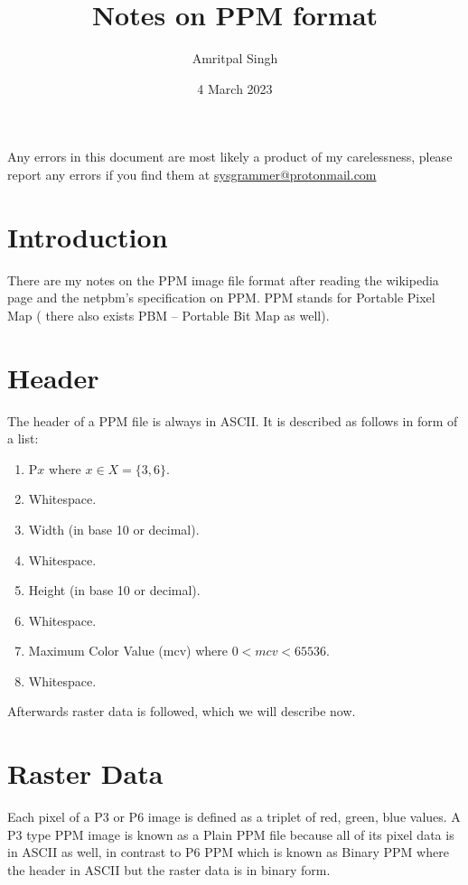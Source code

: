 \documentclass{article}
\title{Notes on PPM format}
\author{Amritpal Singh}
\date{4 March 2023}
\begin{document}
\maketitle

\newpage
\tableofcontents
\vspace{400px}
Any errors in this document are most likely a product of my carelessness, 
please report any errors if you find them at
\href{mailto:sysgrammer@protonmail.com}{sysgrammer@protonmail.com}

\newpage
\section{Introduction}
There are my notes on the PPM image file format after reading the wikipedia page
and the netpbm's specification on PPM. PPM stands for Portable Pixel Map (
there also exists PBM -- Portable Bit Map as well).

\section{Header}
The header of a PPM file is always in ASCII. It is described as follows in form
of a list:
\begin{enumerate}
    \item P$x$ where $x \in X = \{3, 6\}$.
    \item Whitespace.\footnotemark[1]
    \item Width (in base 10 or decimal).
    \item Whitespace.\footnotemark[1]
    \item Height (in base 10 or decimal).
    \item Whitespace.\footnotemark[1]
    \item Maximum Color Value (mcv) where $0 < mcv < 65536$.
    \item Whitespace.\footnotemark[1]
\end{enumerate}


Afterwards raster data is followed, which we will describe now.

\section{Raster Data}

Each pixel of a P3 or P6 image is defined as a triplet of red, green, blue
values. A P3 type PPM image is known as a Plain PPM file because all of its
pixel data is in ASCII as well, in contrast to P6 PPM which is known as Binary
PPM where the header in ASCII but the raster data is in binary form.
\end{document}
